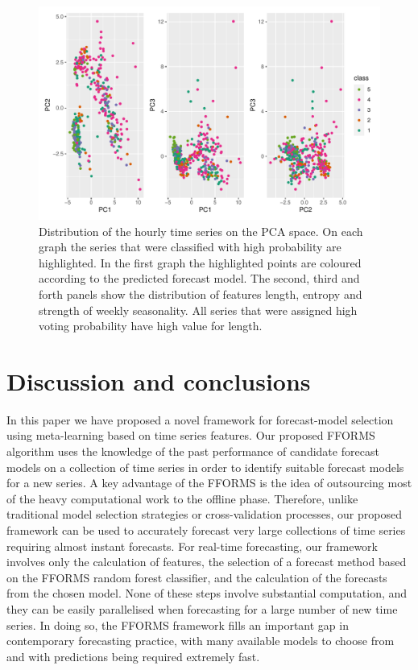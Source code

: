 \documentclass[11pt,a4paper,]{article}
\begin{document}
\begin{figure}[H]

{\centering \includegraphics[width=\textwidth]{figure/pcahourly-1} 

}

\caption{Distribution of the hourly time series on the PCA space. On each graph the series that were classified with high probability are highlighted. In the first graph the highlighted points are coloured according to the predicted forecast model. The second, third and forth panels show the distribution of features length, entropy and strength of weekly seasonality. All series that were assigned high voting probability have high value for length.}\label{fig:pcahourly}
\end{figure}

\hypertarget{discussion}{%
\section{Discussion and conclusions}\label{discussion}}

In this paper we have proposed a novel framework for forecast-model selection using meta-learning based on time series features. Our proposed FFORMS algorithm uses the knowledge of the past performance of candidate forecast models on a collection of time series in order to identify suitable forecast models for a new series. A key advantage of the FFORMS is the idea of outsourcing most of the heavy computational work to the offline phase. Therefore, unlike traditional model selection strategies or cross-validation processes, our proposed framework can be used to accurately forecast very large collections of time series requiring almost instant forecasts. For real-time forecasting, our framework involves only the calculation of features, the selection of a forecast method based on the FFORMS random forest classifier, and the calculation of the forecasts from the chosen model. None of these steps involve substantial computation, and they can be easily parallelised when forecasting for a large number of new time series. In doing so, the FFORMS framework
fills an important gap in contemporary forecasting practice, with many available models
to choose from and with predictions being required extremely fast.
\end{document}
